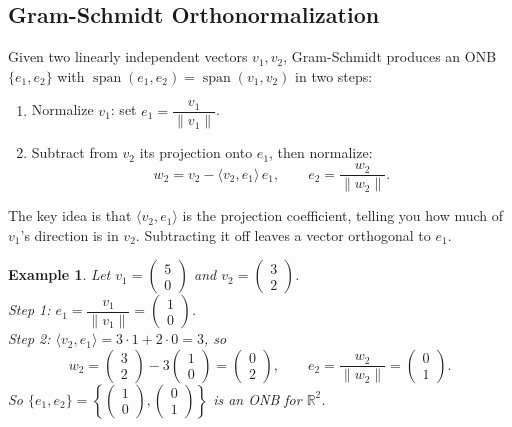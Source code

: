 \documentclass{article}
\newtheorem*{example}{Example}
\newcommand{\Span}{\operatorname{span}}
\begin{document}
\subsection{Gram-Schmidt Orthonormalization}
Given two linearly independent vectors $v_1, v_2$, Gram-Schmidt produces an ONB $\{e_1, e_2\}$ with $\Span(e_1,e_2) = \Span(v_1,v_2)$ in two steps:
\begin{enumerate}
    \item Normalize $v_1$: set $e_1 = \dfrac{v_1}{\|v_1\|}$.
    \item Subtract from $v_2$ its projection onto $e_1$, then normalize:
    \[w_2 = v_2 - \langle v_2, e_1\rangle\, e_1, \qquad e_2 = \frac{w_2}{\|w_2\|}.\]
\end{enumerate}
The key idea is that $\langle v_2, e_1\rangle$ is the projection coefficient, telling you how much of $v_1$'s direction is in $v_2$. Subtracting it off leaves a vector orthogonal to $e_1$.
\begin{example}
    Let $v_1 = \begin{pmatrix}5\\0\end{pmatrix}$ and $v_2 = \begin{pmatrix}3\\2\end{pmatrix}$.\\
    Step 1: $e_1 = \dfrac{v_1}{\|v_1\|} = \begin{pmatrix}1\\0\end{pmatrix}$.\\
    Step 2: $\langle v_2, e_1\rangle = 3\cdot 1 + 2\cdot 0 = 3$, so
    \[w_2 = \begin{pmatrix}3\\2\end{pmatrix} - 3\begin{pmatrix}1\\0\end{pmatrix} = \begin{pmatrix}0\\2\end{pmatrix}, \qquad e_2 = \frac{w_2}{\|w_2\|} = \begin{pmatrix}0\\1\end{pmatrix}.\]
    So $\{e_1, e_2\} = \left\{\begin{pmatrix}1\\0\end{pmatrix},\begin{pmatrix}0\\1\end{pmatrix}\right\}$ is an ONB for $\mathbb{R}^2$.
\end{example}
\end{document}
